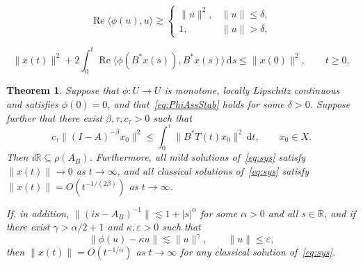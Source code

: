 \documentclass[10pt,a4paper]{amsart}
\newtheorem{thm}{Theorem}
\DeclareMathOperator*{\R}{Re}
\newcommand{\RR}{\mathbb{R}}
\newcommand{\dd}{\mathrm{d}}
\newcommand{\ep}{\varepsilon}
\newcommand{\inv}{^{-1}}
\begin{document}
\begin{equation}
\label{eq:PhiAssStab}
\R\langle\phi(u),u\rangle \gtrsim
\begin{cases}
 \|u\|^2, &   \|u\|\le\delta,\\
1,  &\|u\|>\delta,
\end{cases}
\end{equation}

\begin{equation}\label{eq:energy_balance}
\|x(t)\|^2 + 2\int_0^t \R \langle \phi(B^\ast x(s)),B^\ast x(s)\rangle\,\dd s 
\le \|x(0)\|^2, \qquad t\ge 0,
\end{equation}

\begin{thm}\label{thm:main}
Suppose that $\phi\colon U\to U$ is monotone, locally Lipschitz continuous and satisfies $\phi(0)=0$, and that~\eqref{eq:PhiAssStab}
holds for some $\delta>0$.
Suppose further that there exist $\beta,\tau,c_\tau>0$ such that
\begin{equation}
\label{eq:ObsEstimate}
c_\tau\|(I-A)^{-\beta} x_0\|^2 
\le \int_0^\tau \|B^\ast T(t)x_0\|^2 \,\dd t, \qquad x_0\in X.
\end{equation}
Then
 $i\RR\subseteq\rho(A_B)$. Furthermore,
 all  mild solutions of~\eqref{eq:sys} satisfy $\|x(t)\|\to 0$ as $t\to\infty$, and
 all classical solutions of~\eqref{eq:sys} satisfy $\|x(t)\|=O(t^{-1/(2\beta)})$ as $t\to\infty$.

If, in addition,
$\|(is-A_B)\inv\|\lesssim 1+|s|^\alpha$ for some $\alpha>0$ and all $s\in\RR$, and
 if there exist $\gamma>\alpha/2+1$ and $\kappa,\ep>0$ such that
\begin{equation}
\label{eq:PhiApproximatLinearity}
\|\phi(u)-\kappa u\|\lesssim \|u\|^\gamma, \qquad  \|u\|\le \ep ,
\end{equation}
then $\|x(t)\|= O(t^{-1/\alpha})$ as $t\to\infty$ for any classical solution of~\eqref{eq:sys}.
\end{thm}
\end{document}
